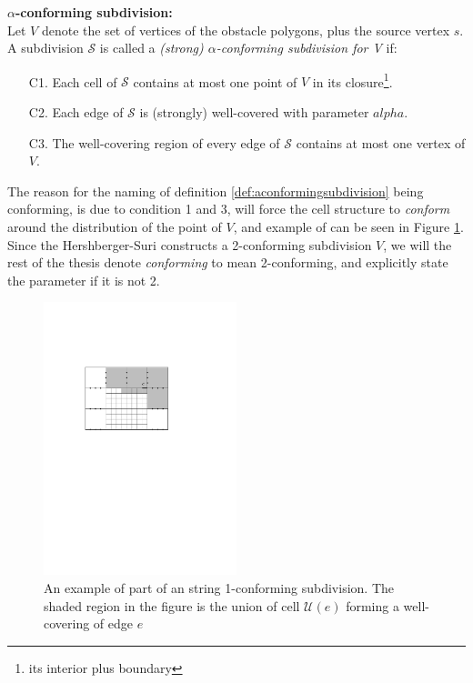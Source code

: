 \begin{mydef}
	\label{def:aconformingsubdivision}
	\textbf{$\alpha$-conforming subdivision:} \\
	Let $V$ denote the set of vertices of the obstacle polygons, plus the source
	vertex $s$. A subdivision $\mathcal{S}$ is called a \textit{(strong)
	$\alpha$-conforming subdivision for V} if:
	\begin{enumerate}
    \setlength\itemsep{1em}
		\item[C1.] Each cell of $\mathcal{S}$ contains at most one point of $V$ in its
				   closure\footnote{its interior plus boundary}.
		\item[C2.] Each edge of $\mathcal{S}$ is (strongly) well-covered with
				   parameter $alpha$.
		\item[C3.] The well-covering region of every edge of $\mathcal{S}$ contains at
				   most one vertex of $V$.
	\end{enumerate}
\end{mydef}

The reason for the naming of definition \ref{def:aconformingsubdivision} being 
conforming, is due to condition 1 and 3, will force the cell structure to 
\textit{conform} around the distribution of the point of $V$, and example of can be seen 
in Figure \ref{fig:1conformingsubdivision}. Since the Hershberger-Suri
constructs a 2-conforming subdivision $V$, we will the rest of the thesis
denote \textit{conforming} to 
mean 2-conforming, and explicitly state the parameter if it is 
not 2. 

\begin{figure}
	\centering
	\includegraphics[width=0.5\textwidth]{figures/1conformingsubdivision.pdf}
	\caption{An example of part of an string 1-conforming subdivision. The shaded region 
    		 in the figure is the union of cell $\mathcal{U}(e)$ forming a well-covering 
             of edge $e$}
	\label{fig:1conformingsubdivision}
\end{figure}

